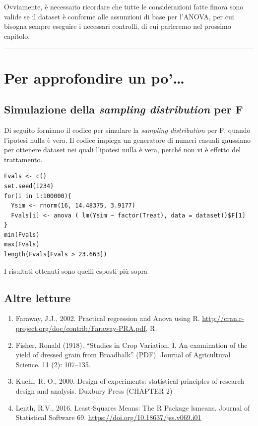 \documentclass[a4paper,12pt,oneside]{book}
\providecommand{\tightlist}{%
  \setlength{\itemsep}{0pt}\setlength{\parskip}{0pt}}
\begin{document}
Ovviamente, è necessario ricordare che tutte le considerazioni fatte finora sono valide se il dataset è conforme alle assunzioni di base per l'ANOVA, per cui bisogna sempre eseguire i necessari controlli, di cui parleremo nel prossimo capitolo.

\begin{center}\rule{0.5\linewidth}{\linethickness}\end{center}

\hypertarget{per-approfondire-un-po-5}{%
\section{Per approfondire un po'\ldots{}}\label{per-approfondire-un-po-5}}

\hypertarget{simulazione-della-sampling-distribution-per-f}{%
\subsection{\texorpdfstring{Simulazione della \emph{sampling distribution} per F}{Simulazione della sampling distribution per F}}\label{simulazione-della-sampling-distribution-per-f}}

Di seguito forniamo il codice per simulare la \emph{sampling distribution} per F, quando l'ipotesi nulla è vera. Il codice impiega un generatore di numeri casuali gaussiano per ottenere dataset nei quali l'ipotesi nulla è vera, perché non vi è effetto del trattamento.

\begin{verbatim}
Fvals <- c()
set.seed(1234)
for(i in 1:100000){
  Ysim <- rnorm(16, 14.48375, 3.9177)
  Fvals[i] <- anova ( lm(Ysim ~ factor(Treat), data = dataset))$F[1]
}
min(Fvals)
max(Fvals)
length(Fvals[Fvals > 23.663])
\end{verbatim}

I risultati ottenuti sono quelli esposti più sopra

\hypertarget{altre-letture-3}{%
\subsection{Altre letture}\label{altre-letture-3}}

\begin{enumerate}
\def\labelenumi{\arabic{enumi}.}
\tightlist
\item
  Faraway, J.J., 2002. Practical regression and Anova using R. \url{http://cran.r-project.org/doc/contrib/Faraway-PRA.pdf}, R.
\item
  Fisher, Ronald (1918). ``Studies in Crop Variation. I. An examination of the yield of dressed grain from Broadbalk'' (PDF). Journal of Agricultural Science. 11 (2): 107--135.
\item
  Kuehl, R. O., 2000. Design of experiments: statistical principles of research design and analysis. Duxbury Press (CHAPTER 2)
\item
  Lenth, R.V., 2016. Least-Squares Means: The R Package lsmeans. Journal of Statistical Software 69. \url{https://doi.org/10.18637/jss.v069.i01}
\end{enumerate}
\end{document}
